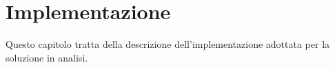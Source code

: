 \section{Implementazione}
Questo capitolo tratta della descrizione dell'implementazione adottata
per la soluzione in analisi.




